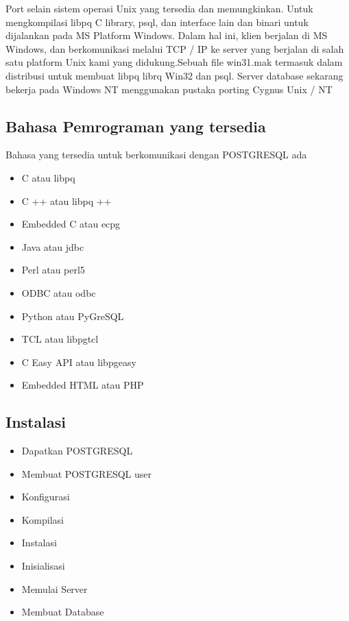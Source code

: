 Port selain sistem operasi Unix yang tersedia dan memungkinkan. 
Untuk mengkompilasi libpq C library, psql, dan interface lain dan binari untuk dijalankan pada MS Platform Windows. Dalam hal ini, klien berjalan di MS Windows, dan berkomunikasi melalui TCP / IP ke server yang berjalan di salah satu platform Unix kami yang didukung.Sebuah file win31.mak termasuk dalam distribusi untuk membuat libpq librq Win32 dan psql. 
Server database sekarang bekerja pada Windows NT menggunakan pustaka porting Cygnus Unix / NT

\subsection {Bahasa Pemrograman yang tersedia}
Bahasa yang tersedia untuk berkomunikasi dengan POSTGRESQL ada
 \begin {itemize}
	\item C atau libpq
	\item C ++ atau libpq ++
	\item Embedded C atau ecpg
	\item Java atau jdbc
	\item Perl atau perl5
	\item ODBC atau odbc
	\item Python atau PyGreSQL
	\item TCL atau libpgtcl
	\item C Easy API atau libpgeasy
	\item Embedded HTML atau PHP
\end {itemize}

\subsection{Instalasi} 
\begin {itemize}
	\item Dapatkan POSTGRESQL
	\item Membuat POSTGRESQL user
	\item Konfigurasi
	\item Kompilasi
	\item Instalasi
	\item Inisialisasi
	\item Memulai Server
	\item Membuat Database
\end {itemize}

